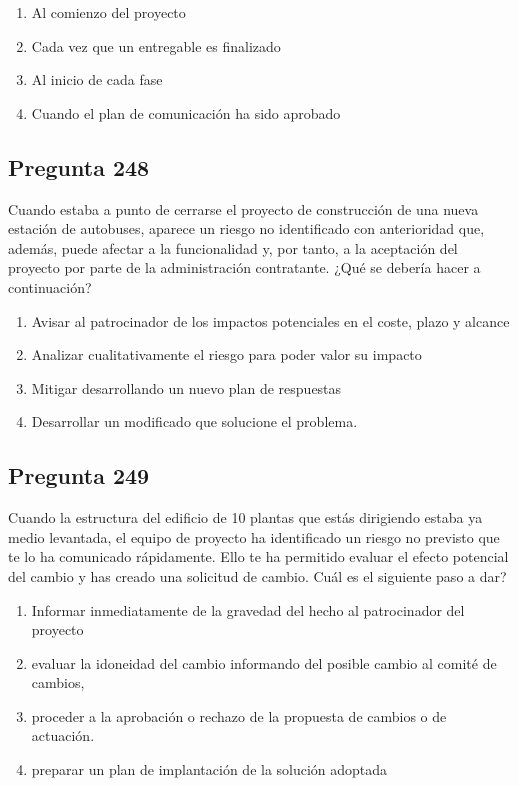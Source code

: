 \documentclass[11pt,a4paper]{article}
\begin{document}
\begin{enumerate}[label=\alph*)]
  \item Al comienzo del proyecto
  \item Cada vez que un entregable es finalizado
  \item Al inicio de cada fase
  \item Cuando el plan de comunicación ha sido aprobado
\end{enumerate}

\subsection*{Pregunta 248}
Cuando estaba a punto de cerrarse el proyecto de construcción de una nueva estación de autobuses, aparece un riesgo no identificado con anterioridad que, además, puede afectar a la funcionalidad y, por tanto, a la aceptación del proyecto por parte de la administración contratante. ¿Qué se debería hacer a continuación?

\begin{enumerate}[label=\alph*)]
  \item Avisar al patrocinador de los impactos potenciales en el coste, plazo y alcance
  \item Analizar cualitativamente el riesgo para poder valor su impacto
  \item Mitigar desarrollando un nuevo plan de respuestas
  \item Desarrollar un modificado que solucione el problema.
\end{enumerate}

\subsection*{Pregunta 249}
Cuando la estructura del edificio de 10 plantas que estás dirigiendo estaba ya medio levantada, el equipo de proyecto ha identificado un riesgo no previsto que te lo ha comunicado rápidamente. Ello te ha permitido evaluar el efecto potencial del cambio y has creado una solicitud de cambio. Cuál es el siguiente paso a dar?

\begin{enumerate}[label=\alph*)]
  \item Informar inmediatamente de la gravedad del hecho al patrocinador del proyecto
  \item evaluar la idoneidad del cambio informando del posible cambio al comité de cambios,
  \item proceder a la aprobación o rechazo de la propuesta de cambios o de actuación.
  \item preparar un plan de implantación de la solución adoptada
\end{enumerate}
\end{document}
